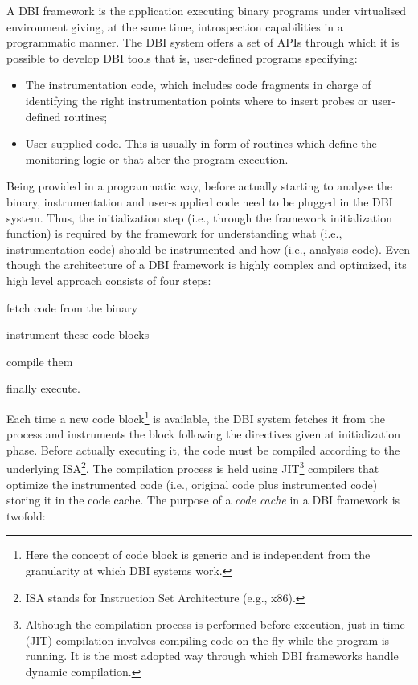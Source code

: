 \documentclass[LaM,binding=0.6cm]{sapthesis}
\begin{document}
A DBI framework is the application executing binary programs under virtualised environment giving, at the same time, introspection capabilities in a programmatic manner. The DBI system offers a set of APIs through which it is possible to develop DBI tools that is, user-defined programs specifying:
\begin{itemize}
\item The instrumentation code, which includes code fragments in charge of identifying the right instrumentation points where to insert probes or user-defined routines;
\item User-supplied code. This is usually in form of routines which define the monitoring logic or that alter the program execution.
\end{itemize}
Being provided in a programmatic way, before actually starting to analyse the binary, instrumentation and user-supplied code need to be plugged in the DBI system. Thus, the initialization step (i.e., through the framework initialization function) is required by the framework for understanding what (i.e., instrumentation code) should be instrumented and how (i.e., analysis code). Even though the architecture of a DBI framework is highly complex and optimized, its high level approach consists of four steps: 
\begin{enumerate*}[label=\roman*),itemjoin={,\quad}]
\item fetch code from the binary
\item instrument these code blocks
\item compile them
\item finally execute.
\end{enumerate*}
Each time a new code block\footnote{Here the concept of code block is generic and is independent from the granularity at which DBI systems work.} is available, the DBI system fetches it from the process and instruments the block following the directives given at initialization phase. Before actually executing it, the code must be compiled according to the underlying ISA\footnote{ISA stands for Instruction Set Architecture (e.g., x$86$).}. The compilation process is held using JIT\footnote{Although the compilation process is performed before execution, just-in-time (JIT) compilation involves compiling code on-the-fly while the program is running. It is the most adopted way through which DBI frameworks handle dynamic compilation.} compilers that optimize the instrumented code (i.e., original code plus instrumented code) storing it in the code cache. The purpose of a \textit{code cache} in a DBI framework is twofold:
\end{document}
